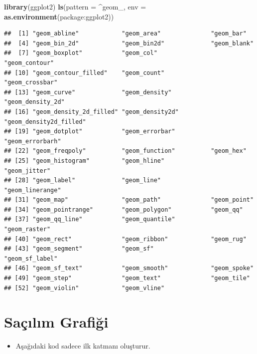 \documentclass[
  oneside]{book}
\newenvironment{Shaded}{\begin{snugshade}}{\end{snugshade}}
\newcommand{\AttributeTok}[1]{\textcolor[rgb]{0.13,0.29,0.53}{#1}}
\newcommand{\FunctionTok}[1]{\textcolor[rgb]{0.13,0.29,0.53}{\textbf{#1}}}
\newcommand{\NormalTok}[1]{#1}
\newcommand{\StringTok}[1]{\textcolor[rgb]{0.31,0.60,0.02}{#1}}
\providecommand{\tightlist}{%
  \setlength{\itemsep}{0pt}\setlength{\parskip}{0pt}}
\begin{document}
\begin{Shaded}
\begin{Highlighting}[]
\FunctionTok{library}\NormalTok{(ggplot2)}
\FunctionTok{ls}\NormalTok{(}\AttributeTok{pattern =} \StringTok{\textquotesingle{}\^{}geom\_\textquotesingle{}}\NormalTok{, }\AttributeTok{env =} \FunctionTok{as.environment}\NormalTok{(}\StringTok{\textquotesingle{}package:ggplot2\textquotesingle{}}\NormalTok{))}
\end{Highlighting}
\end{Shaded}

\begin{verbatim}
##  [1] "geom_abline"            "geom_area"              "geom_bar"              
##  [4] "geom_bin_2d"            "geom_bin2d"             "geom_blank"            
##  [7] "geom_boxplot"           "geom_col"               "geom_contour"          
## [10] "geom_contour_filled"    "geom_count"             "geom_crossbar"         
## [13] "geom_curve"             "geom_density"           "geom_density_2d"       
## [16] "geom_density_2d_filled" "geom_density2d"         "geom_density2d_filled" 
## [19] "geom_dotplot"           "geom_errorbar"          "geom_errorbarh"        
## [22] "geom_freqpoly"          "geom_function"          "geom_hex"              
## [25] "geom_histogram"         "geom_hline"             "geom_jitter"           
## [28] "geom_label"             "geom_line"              "geom_linerange"        
## [31] "geom_map"               "geom_path"              "geom_point"            
## [34] "geom_pointrange"        "geom_polygon"           "geom_qq"               
## [37] "geom_qq_line"           "geom_quantile"          "geom_raster"           
## [40] "geom_rect"              "geom_ribbon"            "geom_rug"              
## [43] "geom_segment"           "geom_sf"                "geom_sf_label"         
## [46] "geom_sf_text"           "geom_smooth"            "geom_spoke"            
## [49] "geom_step"              "geom_text"              "geom_tile"             
## [52] "geom_violin"            "geom_vline"
\end{verbatim}

\hypertarget{sauxe7ux131lux131m-grafiux11fi}{%
\section{Saçılım Grafiği}\label{sauxe7ux131lux131m-grafiux11fi}}

\begin{itemize}
\tightlist
\item
  Aşağıdaki kod sadece ilk katmanı oluşturur.
\end{itemize}
\end{document}
